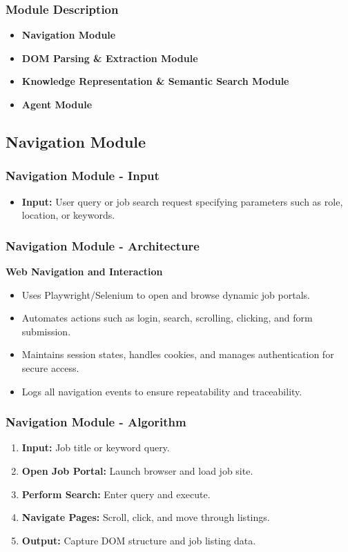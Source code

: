 \documentclass{beamer}
\begin{document}
\begin{frame}
\frametitle{Module Description}
\begin{itemize}
    \item \textbf{Navigation Module}
    \item \textbf{DOM Parsing \& Extraction Module}
    \item \textbf{Knowledge Representation \& Semantic Search Module}
    \item \textbf{Agent Module}
\end{itemize}
\end{frame}

\subsection{Navigation Module}

\begin{frame}
\frametitle{Navigation Module - Input}
\begin{itemize}
    \item \textbf{Input:} User query or job search request specifying parameters such as role, location, or keywords.
\end{itemize}
\end{frame}

\begin{frame}
\frametitle{Navigation Module - Architecture}
\textbf{Web Navigation and Interaction}
\begin{itemize}
    \item Uses Playwright/Selenium to open and browse dynamic job portals.
    \item Automates actions such as login, search, scrolling, clicking, and form submission.
    \item Maintains session states, handles cookies, and manages authentication for secure access.
    \item Logs all navigation events to ensure repeatability and traceability.
\end{itemize}
\end{frame}

\begin{frame} \frametitle{Navigation Module - Algorithm} \begin{enumerate} \item \textbf{Input:} Job title or keyword query. \item \textbf{Open Job Portal:} Launch browser and load job site. \item \textbf{Perform Search:} Enter query and execute. \item \textbf{Navigate Pages:} Scroll, click, and move through listings. \item \textbf{Output:} Capture DOM structure and job listing data. \end{enumerate} \end{frame}
\end{document}
